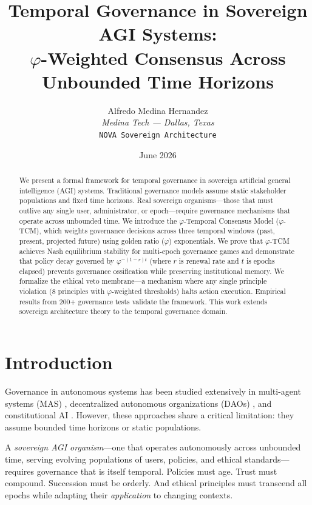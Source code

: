 \documentclass[11pt,twocolumn]{article}
\title{Temporal Governance in Sovereign AGI Systems:\\
  $\varphi$-Weighted Consensus Across Unbounded Time Horizons}
\author{Alfredo Medina Hernandez\\
  \textit{Medina Tech --- Dallas, Texas}\\
  \texttt{NOVA Sovereign Architecture}
}
\date{June 2026}
\begin{document}
\maketitle

\begin{abstract}
We present a formal framework for temporal governance in sovereign artificial
general intelligence (AGI) systems. Traditional governance models assume static
stakeholder populations and fixed time horizons. Real sovereign organisms---those
that must outlive any single user, administrator, or epoch---require governance
mechanisms that operate across unbounded time. We introduce the
$\varphi$-Temporal Consensus Model ($\varphi$-TCM), which weights governance
decisions across three temporal windows (past, present, projected future)
using golden ratio ($\varphi$) exponentials. We prove that $\varphi$-TCM
achieves Nash equilibrium stability for multi-epoch governance games and
demonstrate that policy decay governed by $\varphi^{-(1-r)t}$ (where $r$ is
renewal rate and $t$ is epochs elapsed) prevents governance ossification
while preserving institutional memory. We formalize the ethical veto membrane---a
mechanism where any single principle violation (8 principles with $\varphi$-weighted
thresholds) halts action execution. Empirical results from 200+ governance
tests validate the framework. This work extends sovereign architecture theory
\cite{medina2024architecture} to the temporal governance domain.
\end{abstract}

\section{Introduction}

Governance in autonomous systems has been studied extensively in multi-agent
systems (MAS) \cite{shoham2009multiagent}, decentralized autonomous
organizations (DAOs) \cite{hassan2021decentralized}, and constitutional AI
\cite{bai2022constitutional}. However, these approaches share a critical
limitation: they assume bounded time horizons or static populations.

A \textit{sovereign AGI organism}---one that operates autonomously across
unbounded time, serving evolving populations of users, policies, and
ethical standards---requires governance that is itself temporal. Policies
must age. Trust must compound. Succession must be orderly. And ethical
principles must transcend all epochs while adapting their \textit{application}
to changing contexts.
\end{document}
